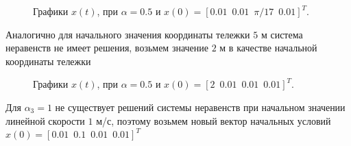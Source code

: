 \begin{figure}[!h]
\caption{Графики $x(t)$, при $\alpha = 0.5$ и $x(0) = [0.01\, \, \,  0.01\, \, \, \pi / 17\, \, \, 0.01]^T$.}
\label{4_3_0.5_3}
\end{figure}


Аналогично для начального значения координаты тележки $5$ м система неравенств не имеет решения, возьмем значение $2$ м в качестве начальной координаты тележки

\begin{figure}[!h]
\caption{Графики $x(t)$, при $\alpha = 0.5$ и $x(0) = [2\, \, \,  0.01\, \, \, 0.01\, \, \, 0.01]^T$.}
\label{4_3_0.5_4}
\end{figure}

\newpage
Для $\alpha_3 = 1$ не существует решений системы неравенств при начальном значении линейной скорости $1$ м/с, поэтому возьмем новый вектор начальных условий $x(0) = [0.01\, \, \,  0.1\, \, \, 0.01\, \, \, 0.01]^T$

